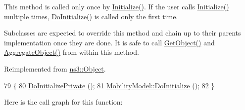 This method is called only once by \hyperlink{classns3_1_1Object_af4411cb29971772fcd09203474a95078}{Initialize()}. If the user calls \hyperlink{classns3_1_1Object_af4411cb29971772fcd09203474a95078}{Initialize()} multiple times, \hyperlink{classns3_1_1RandomWalk2dMobilityModel_a3b8cbd84a8f2e5aced56a37f338369b7}{Do\+Initialize()} is called only the first time.

Subclasses are expected to override this method and chain up to their parent\textquotesingle{}s implementation once they are done. It is safe to call \hyperlink{classns3_1_1Object_a13e18c00017096c8381eb651d5bd0783}{Get\+Object()} and \hyperlink{classns3_1_1Object_a79dd435d300f3deca814553f561a2922}{Aggregate\+Object()} from within this method. 

Reimplemented from \hyperlink{classns3_1_1Object_af8482a521433409fb5c7f749398c9dbe}{ns3\+::\+Object}.


\begin{DoxyCode}
79 \{
80   \hyperlink{classns3_1_1RandomWalk2dMobilityModel_a130059c3aaeeed619641392042bf36c1}{DoInitializePrivate} ();
81   \hyperlink{classns3_1_1Object_af8482a521433409fb5c7f749398c9dbe}{MobilityModel::DoInitialize} ();
82 \}
\end{DoxyCode}


Here is the call graph for this function\+:


